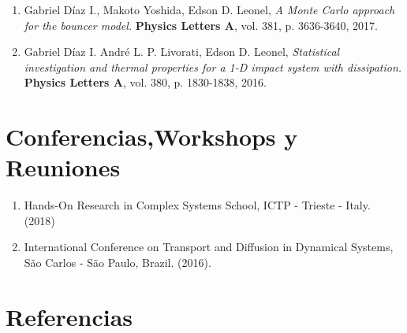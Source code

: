 \documentclass[margin,line]{resume}
\begin{document}
\begin{resume}
\begin{enumerate}
\item Gabriel D\'iaz I., Makoto Yoshida, Edson D. Leonel, {\it A Monte Carlo approach for the bouncer model.} {\bf Physics Letters A}, vol. 381, p. 3636-3640, 2017.

\item Gabriel D\'iaz I. Andr\'e L. P. Livorati, Edson D. Leonel, {\it Statistical investigation and thermal properties for a 1-D impact system with dissipation.} {\bf Physics Letters A}, vol. 380, p. 1830-1838, 2016.
\end{enumerate}

    
   \section{\mysidestyle Conferencias,Workshops y Reuniones} 
\begin{enumerate}
\item  Hands-On Research in Complex Systems School, ICTP - Trieste - Italy. (2018)     
\item  International Conference on Transport and Diffusion in Dynamical Systems, S\~ao Carlos - S\~ao Paulo, Brazil. (2016).

\end{enumerate}


\section{\mysidestyle Referencias} 



\end{resume}
\end{document}

